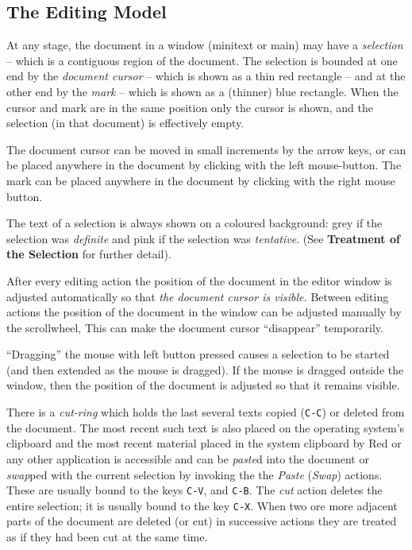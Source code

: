 \documentclass[12pt,a4paper]{article}
\begin{document}
\hypertarget{the-editing-model}{%
\subsection{The Editing Model}\label{the-editing-model}}

At any stage, the document in a window (minitext or main) may have a
\emph{selection} -- which is a contiguous region of the document. The
selection is bounded at one end by the \emph{document cursor} -- which
is shown as a thin red rectangle -- and at the other end by the
\emph{mark} -- which is shown as a (thinner) blue rectangle. When the
cursor and mark are in the same position only the cursor is shown, and
the selection (in that document) is effectively empty.

The document cursor can be moved in small increments by the arrow keys,
or can be placed anywhere in the document by clicking with the left
mouse-button. The mark can be placed anywhere in the document by
clicking with the right mouse button.

The text of a selection is always shown on a coloured background: grey
if the selection was \emph{definite} and pink if the selection was
\emph{tentative}. (See \textbf{Treatment of the Selection} for further
detail).

After every editing action the position of the document in the editor
window is adjusted automatically so that \emph{the document cursor is
visible.} Between editing actions the position of the document in the
window can be adjusted manually by the scrollwheel, This can make the
document cursor ``disappear'' temporarily.

``Dragging'' the mouse with left button pressed causes a selection to be
started (and then extended as the mouse is dragged). If the mouse is
dragged outside the window, then the position of the document is
adjusted so that it remains visible.

There is a \emph{cut-ring} which holds the last several texts copied
(\texttt{C-C}) or deleted from the document. The most recent such text
is also placed on the operating system's clipboard and the most recent
material placed in the system clipboard by Red or any other application
is accessible and can be \emph{paste}d into the document or
\emph{swap}ped with the current selection by invoking the the
\emph{Paste} (\emph{Swap}) actions. These are usually bound to the keys
\texttt{C-V}, and \texttt{C-B}. The \emph{cut} action deletes the entire
selection; it is usually bound to the key \texttt{C-X}. When two ore
more adjacent parts of the document are deleted (or cut) in successive
actions they are treated as if they had been cut at the same time.
\end{document}
